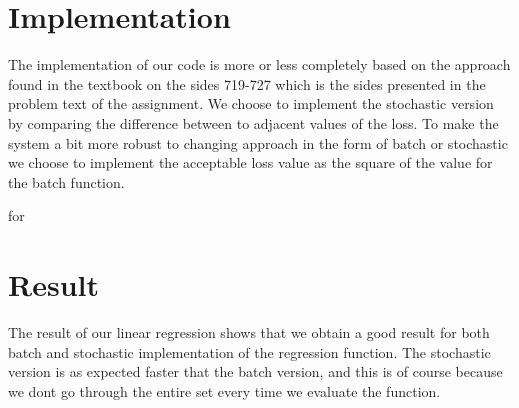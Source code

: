 \documentclass[a4paper]{article}
\begin{document}
\section{Implementation}

The implementation of our code is more or less completely based on the approach found in the textbook on the sides 719-727 which is the sides presented in the problem text of the assignment. We choose to implement the stochastic version by comparing the difference between to adjacent values of the loss. To make the system a bit more robust to changing approach in the form of batch or stochastic we choose to implement the acceptable loss value as the square of the value for the batch function. 


 for 

\section{Result}

The result of our linear regression shows that we obtain a good result for both batch and stochastic implementation of the regression function. The stochastic version is as expected faster that the batch version, and this is of course because we dont go through the entire set every time we evaluate the function. 
\end{document}
